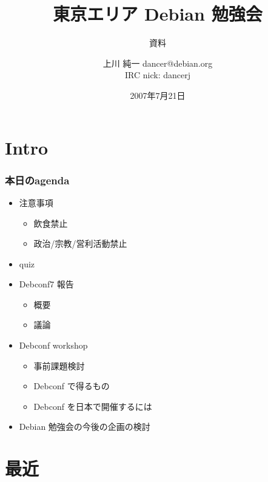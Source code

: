 \documentclass[cjk,dvipdfmx,12pt]{beamer}
\title{東京エリア Debian 勉強会}
\subtitle{資料}
\author{上川 純一 dancer@debian.org\\IRC nick: dancerj}
\date{2007年7月21日}
\begin{document}
\frame{\titlepage{}}

\section{Intro}

\begin{frame}
 \frametitle{本日のagenda}
\begin{minipage}[t]{0.45\hsize}
  \begin{itemize}
  \item 注意事項
	\begin{itemize}
	 \item 飲食禁止
	 \item 政治/宗教/営利活動禁止
	\end{itemize}
  \item quiz
  \item Debconf7 報告
	\begin{itemize}
	 \item 概要
	 \item 議論
	\end{itemize}
 \end{itemize}
\end{minipage} 
\begin{minipage}[t]{0.45\hsize}
 \begin{itemize}
  \item Debconf workshop
	\begin{itemize}
	 \item 事前課題検討
	 \item Debconf で得るもの
	 \item Debconf を日本で開催するには
	\end{itemize}  
\item Debian 勉強会の今後の企画の検討
 \end{itemize}
\end{minipage}
\end{frame}

\section{最近}
\end{document}
